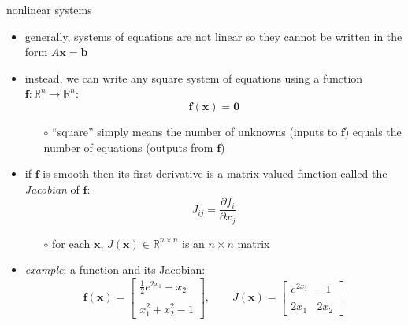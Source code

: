 \documentclass[10pt,hyperref]{beamer}
\newcommand{\bb}{\mathbf{b}}
\newcommand{\bbf}{\mathbf{f}}
\newcommand{\bx}{\mathbf{x}}
\newcommand{\bzero}{\bm{0}}
\newcommand{\RR}{\mathbb{R}}
\begin{document}
\begin{frame}{nonlinear systems}
\begin{itemize}
\item generally, systems of equations are not linear so they cannot be written in the form $A \bx = \bb$
\item instead, we can write any square system of equations using a function $\bbf:\RR^n\to \RR^n$:
    $$\bbf(\bx)=\bzero$$

  \begin{itemize}
  \item[$\circ$] ``square'' simply means the number of unknowns (inputs to $\bbf$) equals the number of equations (outputs from $\bbf$)
  \end{itemize}
\item if $\bbf$ is smooth then its first derivative is a matrix-valued function called the \emph{Jacobian} of $\bbf$:
	$$J_{ij} = \frac{\partial f_i}{\partial x_j}$$

  \begin{itemize}
  \item[$\circ$] for each $\bx$, $J(\bx) \in\RR^{n\times n}$ is an $n\times n$ matrix
  \end{itemize}
\item \emph{example}: a function and its Jacobian:
    $$\bbf(\bx) = \begin{bmatrix} \frac{1}{2} e^{2x_1} - x_2 \\ \\ x_1^2 + x_2^2 - 1 \end{bmatrix}, \qquad
    J(\bx) = \begin{bmatrix} e^{2x_1} & -1 \\ \\
                             2 x_1 & 2 x_2 \end{bmatrix}$$
\end{itemize}
\end{frame}
\end{document}
